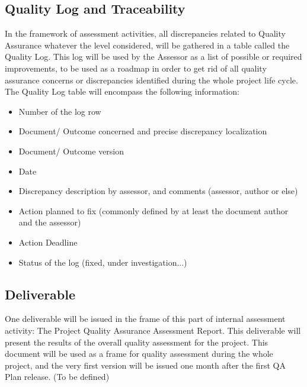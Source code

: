 \documentclass{template/openetcs_article}
\begin{document}
\subsection{Quality Log and Traceability}
In the framework of assessment activities, all discrepancies related to Quality Assurance whatever the level considered, will be gathered in a table called the Quality Log. This log will be used by the Assessor as a list of possible or required improvements, to be used as a roadmap in order to get rid of all quality assurance concerns or discrepancies identified during the whole project life cycle.
The Quality Log table will encompass the following information: 
\begin{itemize}
\item Number of the log row
\item Document/ Outcome concerned and precise discrepancy localization
\item Document/ Outcome version
\item Date
\item Discrepancy description by assessor, and comments (assessor, author or else)
\item Action planned to fix (commonly defined by at least the document author and the assessor)
\item Action Deadline
\item Status of the log (fixed, under investigation...)
\end{itemize}

\subsection{Deliverable}
One deliverable will be issued in the frame of this part of internal assessment activity: The Project Quality Assurance Assessment Report. This deliverable will present the results of the overall quality assessment for the project.
This document will be used as a frame for quality assessment during the whole project, and the very first version will be issued one month after the first QA Plan release. (To be defined)
\end{document}
